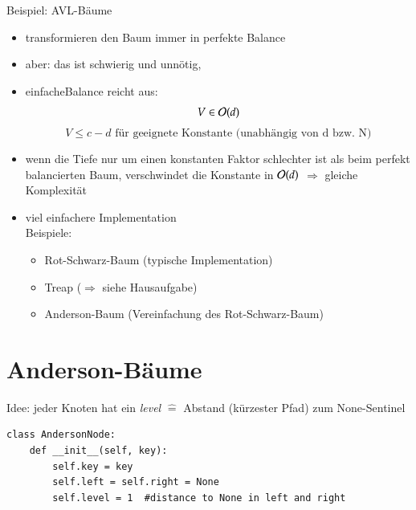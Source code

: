 Beispiel: AVL-Bäume
\begin{itemize}
    \item transformieren den Baum immer in perfekte Balance
    \item aber: das ist schwierig und unnötig,
\end{itemize}
\begin{itemize}[label={$\Rightarrow$}]
    \item \glqq einfache\grqq Balance reicht aus: \[ V \in \mathcal{O}{}(d)\]
    \[ V \leq c - d \text{ für geeignete Konstante (unabhängig von d bzw. N)}\]
    \item wenn die Tiefe nur um einen konstanten Faktor schlechter ist als beim perfekt balancierten Baum, verschwindet die Konstante in $\mathcal{O}{}(d)$ $\Rightarrow$ gleiche Komplexität
    \item viel einfachere Implementation \\
    Beispiele:
    \begin{itemize}
        \item Rot-Schwarz-Baum (typische Implementation)
        \item Treap ($\Rightarrow$ siehe Hausaufgabe)
        \item Anderson-Baum (Vereinfachung des Rot-Schwarz-Baum)
    \end{itemize}
\end{itemize}

\section{Anderson-Bäume}
Idee: jeder Knoten hat ein \emph{level} $\widehat{=}$ Abstand (kürzester Pfad) zum None-Sentinel

\begin{verbatim}
class AndersonNode:
    def __init__(self, key):
        self.key = key
        self.left = self.right = None
        self.level = 1  #distance to None in left and right
\end{verbatim}

